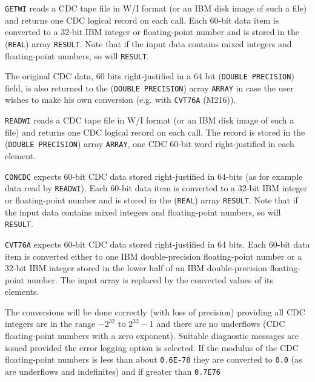                    
      
\Submitter{}                
{\tt GETWI} reads a CDC tape file in W/I format (or an IBM disk image of
such a file) and returns one CDC logical record on each call.
Each 60-bit data item is converted to a 32-bit IBM integer or
floating-point number and is stored in the ({\tt REAL}) array
{\tt RESULT}.
Note that if the input data contains mixed integers and floating-point
numbers, so will {\tt RESULT}.
\par
The original CDC data, 60 bits right-justified in a 64 bit ({\tt DOUBLE
PRECISION}) field, is also returned to the ({\tt DOUBLE PRECISION}) array
{\tt ARRAY} in case the user wishes to make his own conversion (e.g.
with {\tt CVT76A} (M216)).
\par
{\tt READWI} reads a CDC tape file in W/I format (or an IBM disk image
of such a file) and returns one CDC logical record on each call. The
record is stored in the ({\tt DOUBLE PRECISION}) array {\tt ARRAY},
one CDC 60-bit word right-justified in each element.
\par
{\tt CONCDC} expects 60-bit CDC data stored right-justified in 64-bits
(as for example data read by {\tt READWI}). Each 60-bit data item
is converted to a 32-bit IBM integer or floating-point number
and is stored in the ({\tt REAL}) array {\tt RESULT}. Note that if the
input data contains mixed integers and floating-point numbers, so will
{\tt RESULT}.
\par
{\tt CVT76A} expects 60-bit CDC data stored right-justified in 64 bits.
Each 60-bit data item is converted either to one IBM double-precision
floating-point number or a 32-bit IBM integer stored in the lower half
of an IBM double-precision floating-point number. The input array is
replaced by the converted values of its elements.
\par
The conversions will be done correctly (with loss of precision)
providing all CDC integers are in the range $-2^{32}$ to $2^{32}-1$
and there are no underflows (CDC floating-point numbers with a zero
exponent). Suitable diagnostic messages are issued provided the error
logging option is selected. If the modulus of the CDC floating-point
numbers is less than about {\tt 0.6E-78} they are converted to {\tt 0.0}
(as are underflows and indefinites) and if greater than {\tt 0.7E76}
